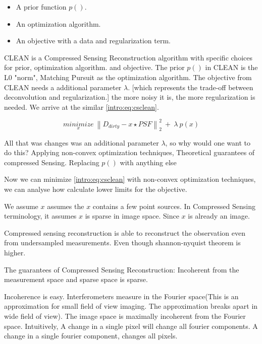 \begin{itemize}
	\item A prior function $p()$.
	\item An optimization algorithm.
	\item An objective with a data and regularization term.
\end{itemize}

CLEAN is a Compressed Sensing Reconstruction algorithm with specific choices for prior, optimization algorithm. and objective. The prior $p()$ in CLEAN is the L0 "norm", Matching Pursuit as the optimization algorithm. The objective from CLEAN needs a additional parameter $\lambda$.  [which represents the trade-off between deconvolution and regularization.] the more noisy it is, the more regularization is needed. We arrive at the similar \eqref{intro:eq:csclean}.

\begin{equation}\label{intro:eq:csclean}
\underset{x}{minimize} \: \left \| D_{dirty} - x \star PSF \right \|_2^2 \: + \: \lambda \: p(x) 
\end{equation}

All that was changes was an additional parameter $\lambda$, so why would one want to do this? 
Applying non-convex optimization techniques,
Theoretical guarantees of compressed Sensing.
Replacing $p()$ with anything else

Now we can minimize \eqref{intro:eq:csclean} with non-convex optimization techniques, we can analyse how calculate lower limits for the objective.


We assume $x$ assumes the $x$ contains a few point sources. In Compressed Sensing terminology, it assumes $x$ is sparse in image space. Since $x$ is already an image.


Compressed sensing reconstruction is able to reconstruct the observation even from undersampled measurements. Even though shannon-nyquist theorem is higher.

The guarantees of Compressed Sensing Reconstruction: Incoherent from the measurement space and sparse space is sparse.

Incoherence is easy. Interferometers measure in the Fourier space(This is an approximation for small field of view imaging. The approximation breaks apart in wide field of view). The image space is maximally incoherent from the Fourier space. Intuitively, A change in a single pixel will change all fourier components. A change in a single fourier component, changes all pixels.

